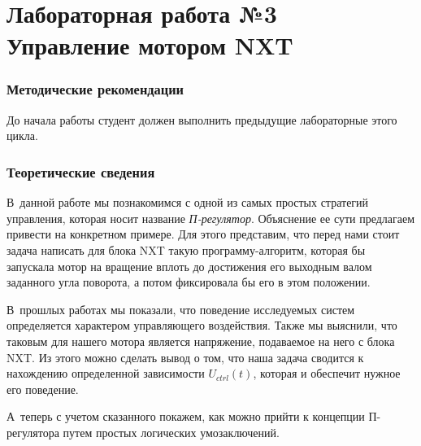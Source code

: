 \documentclass[12pt,a4paper,openany]{extarticle}
\begin{document}
\part*{Лабораторная работа №3\\
Управление мотором NXT}

\section{Методические рекомендации}
\hspace*{\parindent}До начала работы студент должен выполнить предыдущие лабораторные этого цикла.

\section{Теоретические сведения}
\hspace*{\parindent}В~данной работе мы познакомимся с одной из самых простых стратегий управления, которая носит название \textit{П-регулятор}.
Объяснение ее сути предлагаем привести на конкретном примере.
Для этого представим, что перед нами стоит задача написать для блока NXT такую программу-алгоритм, которая бы запускала мотор на вращение вплоть до достижения его выходным валом заданного угла поворота, а потом фиксировала бы его в этом положении.

В~прошлых работах мы показали, что поведение исследуемых систем определяется характером управляющего воздействия.
Также мы выяснили, что таковым для нашего мотора является напряжение, подаваемое на него с блока NXT.
Из этого можно сделать вывод о том, что наша задача сводится к нахождению определенной зависимости $U_{ctrl}(t)$, которая и обеспечит нужное его поведение.

А~теперь с учетом сказанного покажем, как можно прийти к концепции П-регулятора путем простых логических умозаключений.
\end{document}
